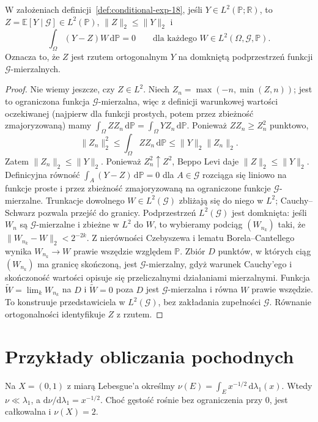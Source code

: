 \begin{twierdzenie}
\label{thm:CE-orthogonal-18}
W założeniach definicji~\ref{def:conditional-exp-18},
jeśli $Y\in L^2(\mathbb P;\mathbb R)$, to
$Z=\mathbb E[Y\mid\mathcal G]\in L^2(\mathbb P)$,
$\|Z\|_2\le\|Y\|_2$ i
\[
\int_\Omega(Y-Z)W\,\mathrm d\mathbb P=0
\qquad\text{dla każdego }W\in L^2(\Omega,\mathcal G,\mathbb P).
\]
Oznacza to, że $Z$ jest rzutem ortogonalnym $Y$
na domkniętą podprzestrzeń funkcji $\mathcal G$-mierzalnych.
\end{twierdzenie}
\begin{proof}
Nie wiemy jeszcze, czy $Z\in L^2$.
Niech $Z_n=\max(-n,\min(Z,n))$; jest to ograniczona
funkcja $\mathcal G$-mierzalna, więc z definicji
warunkowej wartości oczekiwanej (najpierw dla funkcji
prostych, potem przez zbieżność zmajoryzowaną) mamy
$\int_\Omega ZZ_n\,\mathrm d\mathbb P
=\int_\Omega YZ_n\,\mathrm d\mathbb P$.
Ponieważ $ZZ_n\ge Z_n^2$ punktowo,
\[
\|Z_n\|_2^2\le\int_\Omega ZZ_n\,\mathrm d\mathbb P
\le\|Y\|_2\|Z_n\|_2.
\]
Zatem $\|Z_n\|_2\le\|Y\|_2$.
Ponieważ $Z_n^2\uparrow Z^2$, Beppo Levi daje
$\|Z\|_2\le\|Y\|_2$. Definicyjna równość
$\int_A(Y-Z)\,\mathrm d\mathbb P=0$ dla $A\in\mathcal G$
rozciąga się liniowo na funkcje proste i przez
zbieżność zmajoryzowaną na ograniczone funkcje
$\mathcal G$-mierzalne. Trunkacje dowolnego
$W\in L^2(\mathcal G)$ zbliżają się do niego w $L^2$;
Cauchy--Schwarz pozwala przejść do granicy.
Podprzestrzeń $L^2(\mathcal G)$ jest domknięta:
jeśli $W_n$ są $\mathcal G$-mierzalne i zbieżne w $L^2$
do $W$, to wybieramy podciąg $(W_{n_k})$ taki, że
$\|W_{n_k}-W\|_2<2^{-2k}$. Z nierówności
Czebyszewa i lematu Borela--Cantellego wynika
$W_{n_k}\to W$ prawie wszędzie względem $\mathbb P$.
Zbiór $D$ punktów, w których ciąg $(W_{n_k})$
ma granicę skończoną, jest $\mathcal G$-mierzalny,
gdyż warunek Cauchy'ego i skończoność wartości
opisuje się przeliczalnymi działaniami mierzalnymi.
Funkcja $\widetilde W=\lim_kW_{n_k}$ na $D$
i $\widetilde W=0$ poza $D$ jest
$\mathcal G$-mierzalna i równa $W$ prawie wszędzie.
To konstruuje przedstawiciela w $L^2(\mathcal G)$,
bez zakładania zupełności $\mathcal G$.
Równanie ortogonalności identyfikuje $Z$ z rzutem.
\end{proof}

\section{Przykłady obliczania pochodnych}
\begin{przyklad}
Na $X=(0,1)$ z miarą Lebesgue'a określmy
$\nu(E)=\int_E x^{-1/2}\,\mathrm d\lambda_1(x)$.
Wtedy $\nu\ll\lambda_1$, a
$\mathrm d\nu/\mathrm d\lambda_1=x^{-1/2}$.
Choć gęstość rośnie bez ograniczenia przy $0$,
jest całkowalna i $\nu(X)=2$.
\end{przyklad}

